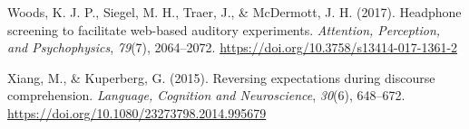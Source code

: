 \documentclass[a4paper, nobind]{templates/ociamthesis}
\newlength{\cslhangindent}
\newenvironment{CSLReferences}[2] %
 {%
  \setlength{\parindent}{0pt}
  \ifodd #1
  \let\oldpar\par
  \def\par{\hangindent=\cslhangindent\oldpar}
  \fi
  \setlength{\parskip}{1mm}
  \setlength{\baselineskip}{6mm}
 }%
 {}
\begin{document}
\begin{CSLReferences}{1}{0}
\leavevmode{}%
Woods, K. J. P., Siegel, M. H., Traer, J., \& McDermott, J. H. (2017). {Headphone screening to facilitate web-based auditory experiments}. \emph{Attention, Perception, and Psychophysics}, \emph{79}(7), 2064--2072. \url{https://doi.org/10.3758/s13414-017-1361-2}

\leavevmode{}%
Xiang, M., \& Kuperberg, G. (2015). {Reversing expectations during discourse comprehension}. \emph{Language, Cognition and Neuroscience}, \emph{30}(6), 648--672. \url{https://doi.org/10.1080/23273798.2014.995679}

\end{CSLReferences}

\end{document}
